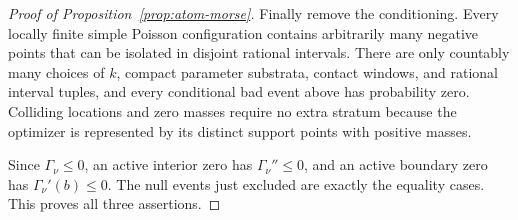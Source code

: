 \begin{proof}[Proof of Proposition~\ref{prop:atom-morse}]
Finally remove the conditioning. Every locally finite simple Poisson
configuration contains arbitrarily many negative points that can be isolated
in disjoint rational intervals. There are only countably many choices of
\(k\), compact parameter substrata, contact windows, and rational interval
tuples, and every conditional bad event above has probability zero.
Colliding locations and zero masses require no extra stratum because the
optimizer is represented by its distinct support points with positive
masses.

Since \(\Gamma_\nu\le0\), an active interior zero has
\(\Gamma_\nu''\le0\), and an active boundary zero has
\(\Gamma_\nu'(b)\le0\). The null events just excluded are exactly the
equality cases. This proves all three assertions.
\end{proof}
